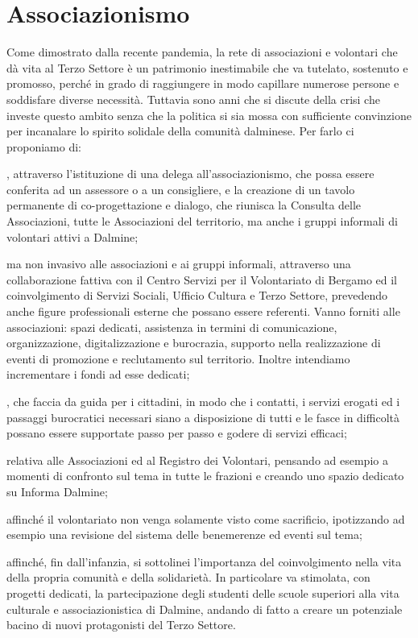 \section{Associazionismo}
Come dimostrato dalla recente pandemia, la rete di associazioni e volontari che dà vita al Terzo Settore è un patrimonio inestimabile che va tutelato, sostenuto e promosso, perché in grado di raggiungere in modo capillare numerose persone e soddisfare diverse necessità. Tuttavia sono anni che si discute della crisi che investe questo ambito senza che la politica si sia mossa con sufficiente convinzione per incanalare lo spirito solidale della comunità dalminese. Per farlo ci proponiamo di:

, attraverso l'istituzione di una delega all'associazionismo, che possa essere conferita ad un assessore o a un consigliere, e la creazione di un tavolo permanente di co-progettazione e dialogo, che riunisca la Consulta delle Associazioni, tutte le Associazioni del territorio, ma anche i gruppi informali di volontari attivi a Dalmine;

 ma non invasivo alle associazioni e ai gruppi informali, attraverso una collaborazione fattiva con il Centro Servizi per il Volontariato di  Bergamo ed il coinvolgimento di Servizi Sociali, Ufficio Cultura e Terzo Settore, prevedendo anche figure professionali esterne che possano essere referenti. Vanno forniti alle associazioni: spazi dedicati, assistenza in termini di comunicazione, organizzazione, digitalizzazione e burocrazia, supporto nella realizzazione di eventi di promozione e reclutamento sul territorio. Inoltre intendiamo incrementare i fondi ad esse dedicati;

, che faccia da guida per i cittadini, in modo che i contatti, i servizi erogati ed i passaggi burocratici necessari siano a disposizione di tutti e le fasce in difficoltà possano essere supportate passo per passo e godere di servizi efficaci;

 relativa alle Associazioni ed al Registro dei Volontari, pensando ad esempio a momenti di confronto sul tema in tutte le frazioni e creando uno spazio dedicato su Informa Dalmine;

 affinché il volontariato non venga solamente visto come sacrificio, ipotizzando ad esempio una revisione del sistema delle benemerenze ed eventi sul tema;

 affinché, fin dall'infanzia, si sottolinei l'importanza del coinvolgimento nella vita della propria comunità e della solidarietà. In particolare va stimolata, con progetti dedicati, la partecipazione degli studenti delle scuole superiori alla vita culturale e associazionistica di Dalmine, andando di fatto a creare un potenziale bacino di nuovi protagonisti del Terzo Settore.
